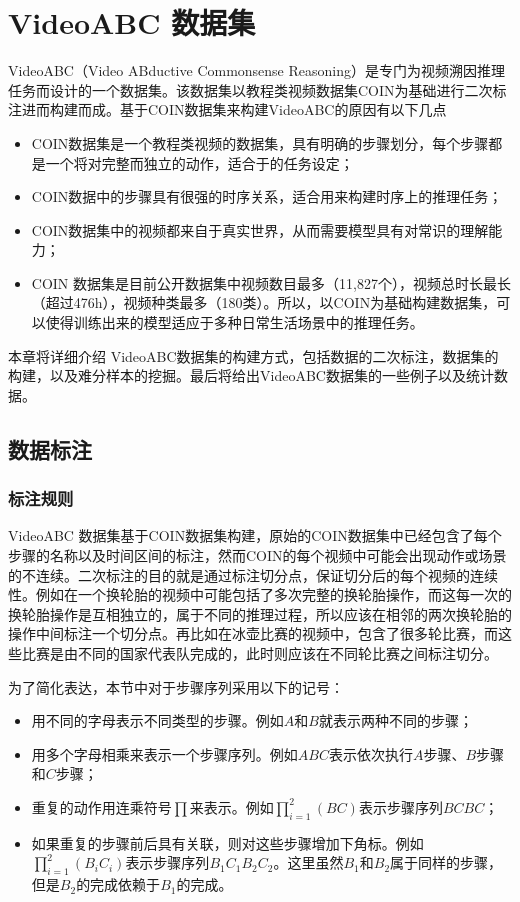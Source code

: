 
\chapter{VideoABC 数据集}\label{cha:VideoABC}
VideoABC（Video ABductive Commonsense Reasoning）是专门为视频溯因推理任务而设计的一个数据集。该数据集以教程类视频数据集COIN\cite{tang2019coin}为基础进行二次标注进而构建而成。基于COIN数据集来构建VideoABC的原因有以下几点
\begin{itemize}
    \item COIN数据集是一个教程类视频的数据集，具有明确的步骤划分，每个步骤都是一个将对完整而独立的动作，适合于\VACR 的任务设定；
    \item COIN数据中的步骤具有很强的时序关系，适合用来构建时序上的推理任务；
    \item COIN数据集中的视频都来自于真实世界，从而需要模型具有对常识的理解能力；
    \item COIN 数据集是目前公开数据集中视频数目最多（11,827个），视频总时长最长（超过476h），视频种类最多（180类）。所以，以COIN为基础构建数据集，可以使得训练出来的模型适应于多种日常生活场景中的推理任务。
\end{itemize}

本章将详细介绍 VideoABC数据集的构建方式，包括数据的二次标注，数据集的构建，以及难分样本的挖掘。最后将给出VideoABC数据集的一些例子以及统计数据。
\section{数据标注}
\subsection{标注规则}
VideoABC 数据集基于COIN数据集构建，原始的COIN数据集中已经包含了每个步骤的名称以及时间区间的标注，然而COIN的每个视频中可能会出现动作或场景的不连续。二次标注的目的就是通过标注切分点，保证切分后的每个视频的连续性。例如在一个换轮胎的视频中可能包括了多次完整的换轮胎操作，而这每一次的换轮胎操作是互相独立的，属于不同的推理过程，所以应该在相邻的两次换轮胎的操作中间标注一个切分点。再比如在冰壶比赛的视频中，包含了很多轮比赛，而这些比赛是由不同的国家代表队完成的，此时则应该在不同轮比赛之间标注切分。

为了简化表达，本节中对于步骤序列采用以下的记号：
\begin{itemize}
    \item 用不同的字母表示不同类型的步骤。例如$A$和$B$就表示两种不同的步骤；
    \item 用多个字母相乘来表示一个步骤序列。例如$ABC$表示依次执行$A$步骤、$B$步骤和$C$步骤；
    \item 重复的动作用连乘符号$\prod$来表示。例如$\prod_{i=1}^{2}(BC)$表示步骤序列$BCBC$；
    \item 如果重复的步骤前后具有关联，则对这些步骤增加下角标。例如$\prod_{i=1}^{2}(B_iC_i)$表示步骤序列$B_1C_1B_2C_2$。这里虽然$B_1$和$B_2$属于同样的步骤，但是$B_2$的完成依赖于$B_1$的完成。
\end{itemize}


